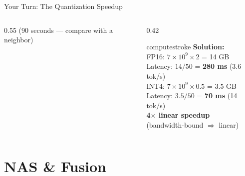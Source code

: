 \documentclass[aspectratio=169, 12pt]{beamer}
\begin{document}
\begin{frame}{Your Turn: The Quantization Speedup}
\begin{columns}[T]
\begin{column}{0.55\textwidth}
    {\scriptsize\textcolor{midgray}{(90 seconds --- compare with a neighbor)}}
  \end{column}
  \begin{column}{0.42\textwidth}
    \pause
    \begin{mlsyscard}{computestroke}
    {\scriptsize \textbf{Solution:}\\[0.05cm]
    FP16: $7\!\times\!10^9\!\times\!2$ = 14 GB\\
    Latency: $14/50$ = \textbf{280 ms} (3.6 tok/s)\\[0.05cm]
    INT4: $7\!\times\!10^9\!\times\!0.5$ = 3.5 GB\\
    Latency: $3.5/50$ = \textbf{70 ms} (14 tok/s)\\[0.05cm]
    \textcolor{computestroke}{\textbf{4$\times$ linear speedup}}\\
    (bandwidth-bound $\Rightarrow$ linear)}
    \end{mlsyscard}
  \end{column}
\end{columns}

\end{frame}

\section{NAS \& Fusion}
\end{document}
